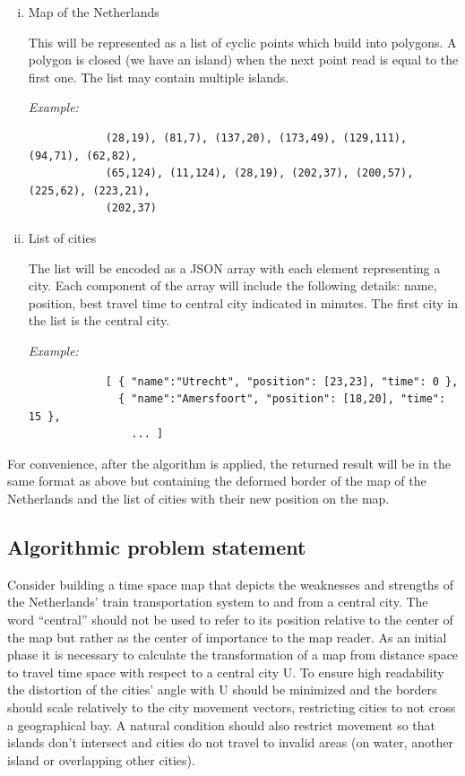 \documentclass[a4paper,11pt]{article}
\begin{document}
\begin{enumerate}[(i)]
	\item Map of the Netherlands
	
          This will be represented as a list of cyclic points which
          build into polygons. A polygon is closed (we have an island)
          when the next point read is equal to the first one. The list
          may contain multiple islands.
		
		\emph{Example:} 
		\begin{verbatim}
			(28,19), (81,7), (137,20), (173,49), (129,111), (94,71), (62,82),
			(65,124), (11,124), (28,19), (202,37), (200,57), (225,62), (223,21),
			(202,37)
		\end{verbatim}

	\item List of cities
	
          The list will be encoded as a JSON array with each element
          representing a city. Each component of the array will
          include the following details: name, position, best travel
          time to central city indicated in minutes. The first city in
          the list is the central city.
		
		\emph{Example:}
		\begin{verbatim}
			[ { "name":"Utrecht", "position": [23,23], "time": 0 },
			  { "name":"Amersfoort", "position": [18,20], "time": 15 },
				... ]
		\end{verbatim}
\end{enumerate}

For convenience, after the algorithm is applied, the returned result
will be in the same format as above but containing the deformed border
of the map of the Netherlands and the list of cities with their new
position on the map.

\subsection{Algorithmic problem statement}

Consider building a time space map that depicts the weaknesses and
strengths of the Netherlands' train transportation system to and from
a central city. The word ``central'' should not be used to refer to
its position relative to the center of the map but rather as the
center of importance to the map reader. As an initial phase it is
necessary to calculate the transformation of a map from distance space
to travel time space with respect to a central city U. To ensure high
readability the distortion of the cities' angle with U should be
minimized and the borders should scale relatively to the city movement
vectors, restricting cities to not cross a geographical bay. A natural
condition should also restrict movement so that islands don't
intersect and cities do not travel to invalid areas (on water, another
island or overlapping other cities).
\end{document}
